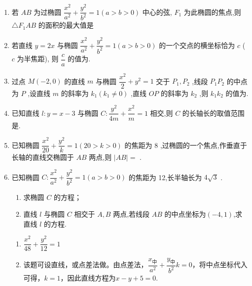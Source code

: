 \begin{enumerate}
 \item 若 ${AB}$ 为过椭圆 $\dfrac{{x}^{2}}{{a}^{2}} + \dfrac{{y}^{2}}{{b}^{2}} = 1\left( {a > b > 0}\right)$ 中心的弦, ${F}_{1}$ 为此椭圆的焦点,则 $\bigtriangleup  {F}_{1}{AB}$ 的面积的最大值是



 \item 若直线 $y = {2x}$ 与椭圆 $\dfrac{{x}^{2}}{{a}^{2}} + \dfrac{{y}^{2}}{{b}^{2}} = 1\left( {a > b > 0}\right)$ 的一个交点的横坐标恰为 $c$ ( $c$ 为半焦距), 则 $\dfrac{c}{a}$ 的值为.

 \item 过点 $M\left( {-2,0}\right)$ 的直线 $m$ 与椭圆 $\dfrac{{x}^{2}}{2} + {y}^{2} = 1$ 交于 ${P}_{1},{P}_{2}$ ,线段 ${P}_{1}{P}_{2}$ 的中点为 $P$ ,设直线 $m$ 的斜率为 ${k}_{1}\left( {{k}_{1} \neq  0}\right)$ ,直线 ${OP}$ 的斜率为 ${{k}}_{2}$ ,则 ${k}_{1}{k}_{2}$ 的值为.

 \item 已知直线 $l : y = x - 3$ 与椭圆 $C : \dfrac{{y}^{2}}{4m} + \dfrac{{x}^{2}}{m} = 1$ 相交,则 $C$ 的长轴长的取值范围是.

 \item 已知椭圆 $\dfrac{{x}^{2}}{20} + \dfrac{{y}^{2}}{k} = 1\left( {{20} > k > 0}\right)$ 的焦距为 8 ,过椭圆的一个焦点,作垂直于长轴的直线交椭圆于 ${AB}$ 两点,则 $\left| {AB}\right|  =$ .

 \item 已知椭圆 $C : \dfrac{{x}^{2}}{{a}^{2}} + \dfrac{{y}^{2}}{{b}^{2}} = 1\left( {a > b > 0}\right)$ 的焦距为 12,长半轴长为 $4\sqrt{3}$ .
 \begin{enumerate}
     \item 求椭圆 $C$ 的方程；
     \item 直线 $l$ 与椭圆 $C$ 相交于 $A,B$ 两点,若线段 ${AB}$ 的中点坐标为$(-4,1)$,求直线 $l$ 的方程.
 \end{enumerate}
\begin{jieda}
    \begin{enumerate}
        \item $\dfrac{x^2}{48}+\dfrac{y^2}{12}=1$
        \item 该题可设直线，或点差法做。由点差法，$\dfrac{x_中}{a^2}+\dfrac{y_中}{b^2}k=0$，将中点坐标代入可得，$k=1$，因此直线方程为$x-y+5=0$.
    \end{enumerate}
\end{jieda}


\end{enumerate}
